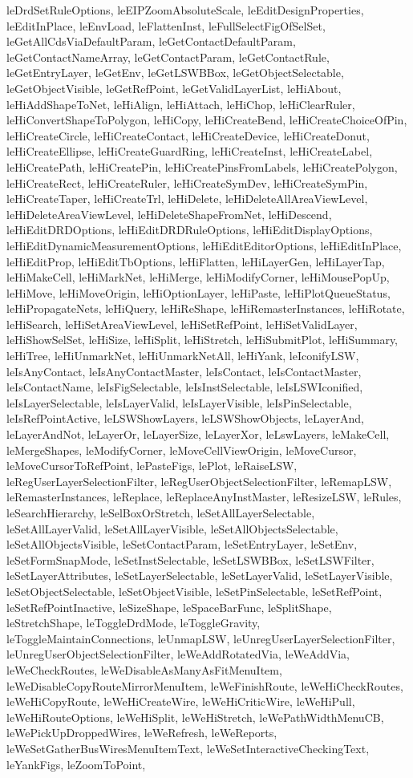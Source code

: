 {{leDrdSetRuleOptions, leEIPZoomAbsoluteScale, leEditDesignProperties, leEditInPlace, leEnvLoad, leFlattenInst, leFullSelectFigOfSelSet, leGetAllCdsViaDefaultParam, leGetContactDefaultParam, leGetContactNameArray, leGetContactParam, leGetContactRule, leGetEntryLayer, leGetEnv, leGetLSWBBox, leGetObjectSelectable, leGetObjectVisible, leGetRefPoint, leGetValidLayerList, leHiAbout, leHiAddShapeToNet, leHiAlign, leHiAttach, leHiChop, leHiClearRuler, leHiConvertShapeToPolygon, leHiCopy, leHiCreateBend, leHiCreateChoiceOfPin, leHiCreateCircle, leHiCreateContact, leHiCreateDevice, leHiCreateDonut, leHiCreateEllipse, leHiCreateGuardRing, leHiCreateInst, leHiCreateLabel, leHiCreatePath, leHiCreatePin, leHiCreatePinsFromLabels, leHiCreatePolygon, leHiCreateRect, leHiCreateRuler, leHiCreateSymDev, leHiCreateSymPin, leHiCreateTaper, leHiCreateTrl, leHiDelete, leHiDeleteAllAreaViewLevel, leHiDeleteAreaViewLevel, leHiDeleteShapeFromNet, leHiDescend, leHiEditDRDOptions, leHiEditDRDRuleOptions, leHiEditDisplayOptions, leHiEditDynamicMeasurementOptions, leHiEditEditorOptions, leHiEditInPlace, leHiEditProp, leHiEditTbOptions, leHiFlatten, leHiLayerGen, leHiLayerTap, leHiMakeCell, leHiMarkNet, leHiMerge, leHiModifyCorner, leHiMousePopUp, leHiMove, leHiMoveOrigin, leHiOptionLayer, leHiPaste, leHiPlotQueueStatus, leHiPropagateNets, leHiQuery, leHiReShape, leHiRemasterInstances, leHiRotate, leHiSearch, leHiSetAreaViewLevel, leHiSetRefPoint, leHiSetValidLayer, leHiShowSelSet, leHiSize, leHiSplit, leHiStretch, leHiSubmitPlot, leHiSummary, leHiTree, leHiUnmarkNet, leHiUnmarkNetAll, leHiYank, leIconifyLSW, leIsAnyContact, leIsAnyContactMaster, leIsContact, leIsContactMaster, leIsContactName, leIsFigSelectable, leIsInstSelectable, leIsLSWIconified, leIsLayerSelectable, leIsLayerValid, leIsLayerVisible, leIsPinSelectable, leIsRefPointActive, leLSWShowLayers, leLSWShowObjects, leLayerAnd, leLayerAndNot, leLayerOr, leLayerSize, leLayerXor, leLswLayers, leMakeCell, leMergeShapes, leModifyCorner, leMoveCellViewOrigin, leMoveCursor, leMoveCursorToRefPoint, lePasteFigs, lePlot, leRaiseLSW, leRegUserLayerSelectionFilter, leRegUserObjectSelectionFilter, leRemapLSW, leRemasterInstances, leReplace, leReplaceAnyInstMaster, leResizeLSW, leRules, leSearchHierarchy, leSelBoxOrStretch, leSetAllLayerSelectable, leSetAllLayerValid, leSetAllLayerVisible, leSetAllObjectsSelectable, leSetAllObjectsVisible, leSetContactParam, leSetEntryLayer, leSetEnv, leSetFormSnapMode, leSetInstSelectable, leSetLSWBBox, leSetLSWFilter, leSetLayerAttributes, leSetLayerSelectable, leSetLayerValid, leSetLayerVisible, leSetObjectSelectable, leSetObjectVisible, leSetPinSelectable, leSetRefPoint, leSetRefPointInactive, leSizeShape, leSpaceBarFunc, leSplitShape, leStretchShape, leToggleDrdMode, leToggleGravity, leToggleMaintainConnections, leUnmapLSW, leUnregUserLayerSelectionFilter, leUnregUserObjectSelectionFilter, leWeAddRotatedVia, leWeAddVia, leWeCheckRoutes, leWeDisableAsManyAsFitMenuItem, leWeDisableCopyRouteMirrorMenuItem, leWeFinishRoute, leWeHiCheckRoutes, leWeHiCopyRoute, leWeHiCreateWire, leWeHiCriticWire, leWeHiPull, leWeHiRouteOptions, leWeHiSplit, leWeHiStretch, leWePathWidthMenuCB, leWePickUpDroppedWires, leWeRefresh, leWeReports, leWeSetGatherBusWiresMenuItemText, leWeSetInteractiveCheckingText, leYankFigs, leZoomToPoint, }}
